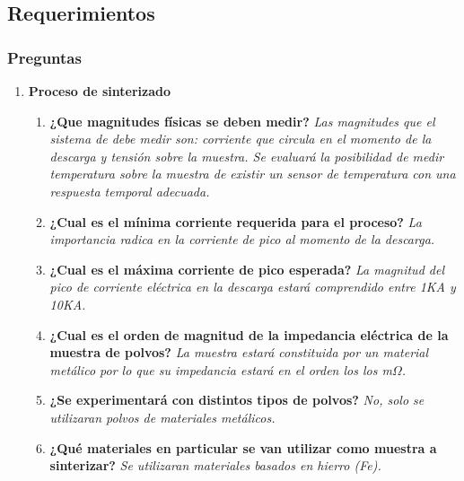 
  \subsection{Requerimientos}  

\subsubsection{Preguntas}
  
 \begin{enumerate} 
    \item \textbf{ Proceso de sinterizado }
	\begin{enumerate}
	  \item \textbf{ ¿Que magnitudes físicas se deben medir? }
		\subitem	\textit{ Las magnitudes que el sistema de debe medir son: corriente que circula en el momento de la descarga y 
					tensión sobre la muestra. Se evaluará la posibilidad de medir temperatura sobre la muestra de existir un
					sensor de temperatura con una respuesta temporal adecuada.
			}

	  \item \textbf{ ¿Cual es el mínima corriente requerida para el proceso? }
		\subitem	\textit{ La importancia radica en la corriente de pico al momento de la descarga.
				}

	  \item \textbf{ ¿Cual es el máxima corriente de pico esperada? }
		\subitem	\textit{ La magnitud del pico de corriente eléctrica en la descarga estará comprendido entre 1KA y 10KA.
				}

	  \item \textbf{ ¿Cual es el orden de magnitud de la impedancia eléctrica de la muestra de polvos? }
		\subitem	\textit{ La muestra estará constituida por un material metálico por lo que su impedancia estará en el orden los los m$\Omega$.
				}

	  \item \textbf{ ¿Se experimentará con distintos tipos de polvos? }
		\subitem	\textit{ No, solo se utilizaran polvos de materiales metálicos.
				}

          \item \textbf{ ¿Qué materiales en particular se van utilizar como muestra a sinterizar? }
		\subitem	\textit{ Se utilizaran materiales basados en hierro (Fe).
				}


\end{enumerate}
\end{enumerate}
